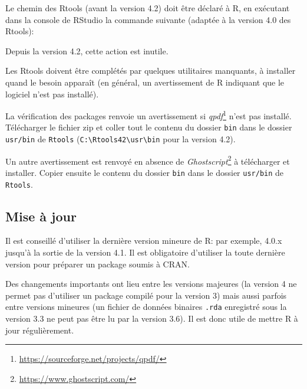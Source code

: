 \documentclass[
  12pt,
  french,
  a4paper,
  extrafontsizes,onecolumn,openright
  ]{memoir}
\newenvironment{Shaded}{\begin{snugshade}}{\end{snugshade}}
\newcommand{\AttributeTok}[1]{\textcolor[rgb]{0.13,0.29,0.53}{#1}}
\newcommand{\CommentTok}[1]{\textcolor[rgb]{0.56,0.35,0.01}{\textit{#1}}}
\newcommand{\FunctionTok}[1]{\textcolor[rgb]{0.13,0.29,0.53}{\textbf{#1}}}
\newcommand{\NormalTok}[1]{#1}
\newcommand{\SpecialCharTok}[1]{\textcolor[rgb]{0.81,0.36,0.00}{\textbf{#1}}}
\newcommand{\StringTok}[1]{\textcolor[rgb]{0.31,0.60,0.02}{#1}}
\newlength{\rf}
\begin{document}
Le chemin des Rtools (avant la version 4.2) doit être déclaré à R, en exécutant dans la console de RStudio la commande suivante (adaptée à la version 4.0 des Rtools):

\scriptsize

\begin{Shaded}
\end{Shaded}

\normalsize

Depuis la version 4.2, cette action est inutile.

Les Rtools doivent être complétés par quelques utilitaires manquants, à installer quand le besoin apparaît (en général, un avertissement de R indiquant que le logiciel n'est pas installé).

La vérification des packages renvoie un avertissement si \emph{qpdf}\footnote{\url{https://sourceforge.net/projects/qpdf/}} n'est pas installé.
Télécharger le fichier zip et coller tout le contenu du dossier \texttt{bin} dans le dossier \texttt{usr/bin} de \texttt{Rtools} (\texttt{C:\textbackslash{}Rtools42\textbackslash{}usr\textbackslash{}bin} pour la version 4.2).

Un autre avertissement est renvoyé en absence de \emph{Ghostscript}\footnote{\url{https://www.ghostscript.com/}} à télécharger et installer.
Copier ensuite le contenu du dossier \texttt{bin} dans le dossier \texttt{usr/bin} de \texttt{Rtools}.

\subsection{Mise à jour}\label{mise-uxe0-jour}

Il est conseillé d'utiliser la dernière version mineure de R: par exemple, 4.0.x jusqu'à la sortie de la version 4.1.
Il est obligatoire d'utiliser la toute dernière version pour préparer un package soumis à CRAN.

Des changements importants ont lieu entre les versions majeures (la version 4 ne permet pas d'utiliser un package compilé pour la version 3) mais aussi parfois entre versions mineures (un fichier de données binaires \texttt{.rda} enregistré sous la version 3.3 ne peut pas être lu par la version 3.6).
Il est donc utile de mettre R à jour régulièrement.
\end{document}
